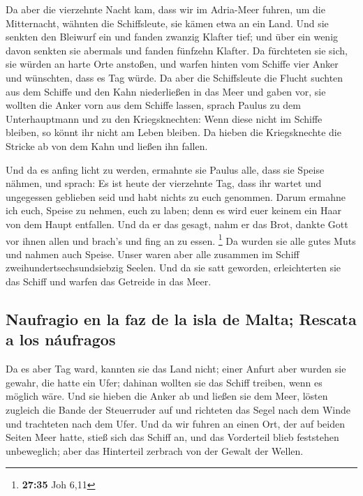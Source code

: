  Da aber die vierzehnte Nacht kam, dass wir im Adria-Meer
fuhren, um die Mitternacht, wähnten die Schiffsleute, sie kämen etwa an
ein Land.  Und sie senkten den Bleiwurf ein und fanden
zwanzig Klafter tief; und über ein wenig davon senkten sie abermals und
fanden fünfzehn Klafter.  Da fürchteten sie sich, sie
würden an harte Orte anstoßen, und warfen hinten vom Schiffe vier Anker
und wünschten, dass es Tag würde.  Da aber die
Schiffsleute die Flucht suchten aus dem Schiffe und den Kahn
niederließen in das Meer und gaben vor, sie wollten die Anker vorn aus
dem Schiffe lassen,  sprach Paulus zu dem Unterhauptmann
und zu den Kriegsknechten: Wenn diese nicht im Schiffe bleiben, so könnt
ihr nicht am Leben bleiben.  Da hieben die Kriegsknechte
die Stricke ab von dem Kahn und ließen ihn fallen.

 Und da es anfing licht zu werden, ermahnte sie Paulus
alle, dass sie Speise nähmen, und sprach: Es ist heute der vierzehnte
Tag, dass ihr wartet und ungegessen geblieben seid und habt nichts zu
euch genommen.  Darum ermahne ich euch, Speise zu nehmen,
euch zu laben; denn es wird euer keinem ein Haar von dem Haupt
entfallen.  Und da er das gesagt, nahm er das Brot,
dankte Gott vor ihnen allen und brach's und fing an zu essen.
\footnote{\textbf{27:35} Joh 6,11}  Da wurden sie alle
gutes Muts und nahmen auch Speise.  Unser waren aber alle
zusammen im Schiff zweihundertsechsundsiebzig Seelen. 
Und da sie satt geworden, erleichterten sie das Schiff und warfen das
Getreide in das Meer.

\hypertarget{naufragio-en-la-faz-de-la-isla-de-malta-rescata-a-los-nuxe1ufragos}{%
\subsection{Naufragio en la faz de la isla de Malta; Rescata a los
náufragos}\label{naufragio-en-la-faz-de-la-isla-de-malta-rescata-a-los-nuxe1ufragos}}

 Da es aber Tag ward, kannten sie das Land nicht; einer
Anfurt aber wurden sie gewahr, die hatte ein Ufer; dahinan wollten sie
das Schiff treiben, wenn es möglich wäre.  Und sie hieben
die Anker ab und ließen sie dem Meer, lösten zugleich die Bande der
Steuerruder auf und richteten das Segel nach dem Winde und trachteten
nach dem Ufer.  Und da wir fuhren an einen Ort, der auf
beiden Seiten Meer hatte, stieß sich das Schiff an, und das Vorderteil
blieb feststehen unbeweglich; aber das Hinterteil zerbrach von der
Gewalt der Wellen.


